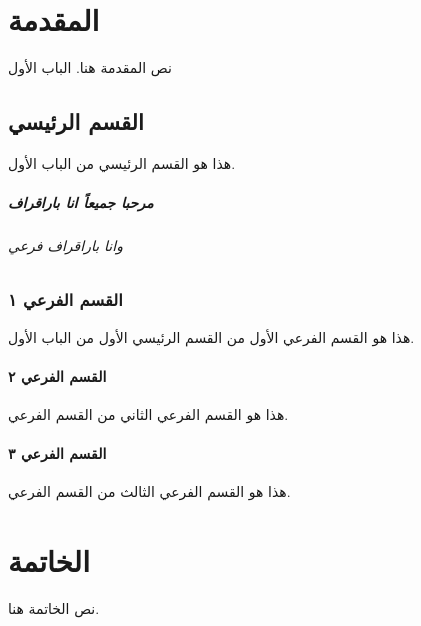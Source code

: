 \documentclass[a4paper,12pt]{book}
\begin{document}
	\begin{otherlanguage}{arabic}
	

	\chapter*{المقدمة}
	نص المقدمة هنا.	الباب الأول
	
	\section{القسم الرئيسي}
	هذا هو القسم الرئيسي من الباب الأول.
	\paragraph{مرحبا جميعاً انا باراقراف}
	\subparagraph{وانا باراقراف فرعي}
	
	
	\subsection{القسم الفرعي ١}
	هذا هو القسم الفرعي الأول من القسم الرئيسي الأول من الباب الأول.
	
	\subsubsection{القسم الفرعي ٢}
	هذا هو القسم الفرعي الثاني من القسم الفرعي.
	
	\subsubsection{القسم الفرعي ٣}
	هذا هو القسم الفرعي الثالث من القسم الفرعي.
	
	
	
	\chapter*{الخاتمة}
	نص الخاتمة هنا.
	

\end{otherlanguage}
\end{document}
